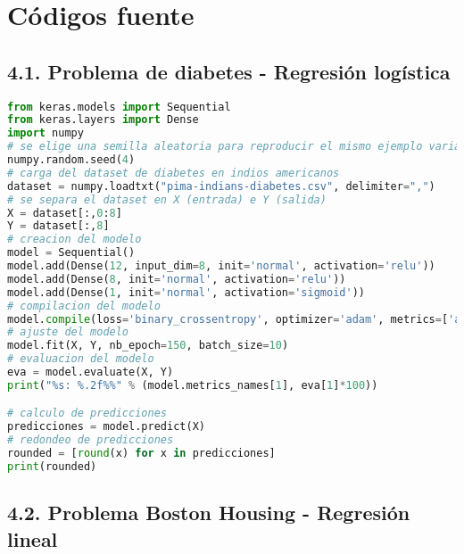 \chapter{Códigos fuente}
\label{Anexo:codigo}

\section{4.1. Problema de diabetes - Regresión logística}
\begin{lstlisting}[language=Python]
from keras.models import Sequential
from keras.layers import Dense
import numpy
# se elige una semilla aleatoria para reproducir el mismo ejemplo varias veces
numpy.random.seed(4)
# carga del dataset de diabetes en indios americanos
dataset = numpy.loadtxt("pima-indians-diabetes.csv", delimiter=",")
# se separa el dataset en X (entrada) e Y (salida)
X = dataset[:,0:8]
Y = dataset[:,8]
# creacion del modelo
model = Sequential()
model.add(Dense(12, input_dim=8, init='normal', activation='relu'))
model.add(Dense(8, init='normal', activation='relu'))
model.add(Dense(1, init='normal', activation='sigmoid'))
# compilacion del modelo
model.compile(loss='binary_crossentropy', optimizer='adam', metrics=['accuracy'])
# ajuste del modelo
model.fit(X, Y, nb_epoch=150, batch_size=10)
# evaluacion del modelo
eva = model.evaluate(X, Y)
print("%s: %.2f%%" % (model.metrics_names[1], eva[1]*100))

# calculo de predicciones
predicciones = model.predict(X)
# redondeo de predicciones
rounded = [round(x) for x in predicciones]
print(rounded)
\end{lstlisting}

\section{4.2. Problema Boston Housing - Regresión lineal }
